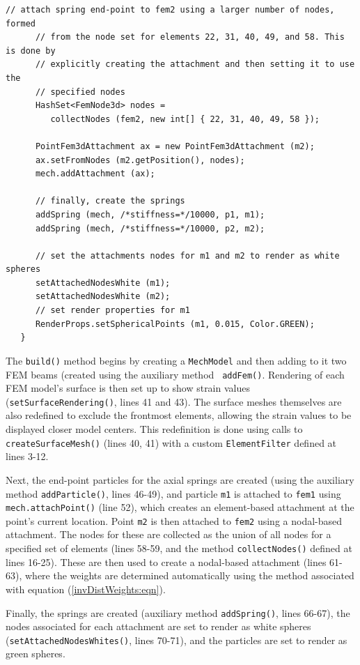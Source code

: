 \begin{lstlisting}[]
      // attach spring end-point to fem2 using a larger number of nodes, formed
      // from the node set for elements 22, 31, 40, 49, and 58. This is done by
      // explicitly creating the attachment and then setting it to use the
      // specified nodes
      HashSet<FemNode3d> nodes =
         collectNodes (fem2, new int[] { 22, 31, 40, 49, 58 });

      PointFem3dAttachment ax = new PointFem3dAttachment (m2);
      ax.setFromNodes (m2.getPosition(), nodes);
      mech.addAttachment (ax);

      // finally, create the springs
      addSpring (mech, /*stiffness=*/10000, p1, m1);
      addSpring (mech, /*stiffness=*/10000, p2, m2);

      // set the attachments nodes for m1 and m2 to render as white spheres
      setAttachedNodesWhite (m1);
      setAttachedNodesWhite (m2);
      // set render properties for m1
      RenderProps.setSphericalPoints (m1, 0.015, Color.GREEN);
   }
\end{lstlisting}
\lstset{numbers=none}
The {\tt build()} method begins by creating a {\tt MechModel} and then
adding to it two FEM beams (created using the auxiliary method {\tt
addFem()}. Rendering of each FEM model's surface is then set up to
show strain values ({\tt setSurfaceRendering()}, lines 41 and 43).
The surface meshes themselves are also redefined to exclude the
frontmost elements, allowing the strain values to be displayed closer
model centers. This redefinition is done using calls to {\tt
createSurfaceMesh()} (lines 40, 41) with a custom {\tt ElementFilter}
defined at lines 3-12.

Next, the end-point particles for the axial springs are created (using
the auxiliary method {\tt addParticle()}, lines
46-49), and particle {\tt m1} is attached to {\tt fem1} using {\tt
mech.attachPoint()} (line 52), which creates an element-based
attachment at the point's current location. Point {\tt m2} is then
attached to {\tt fem2} using a nodal-based attachment.  The nodes for
these are collected as the union of all nodes for a specified set of
elements (lines 58-59, and the method {\tt collectNodes()} defined at
lines 16-25). These are then used to create a nodal-based attachment
(lines 61-63), where the weights are determined automatically using
the method associated with equation (\ref{invDistWeights:eqn}).

Finally, the springs are created (auxiliary method {\tt addSpring()},
lines 66-67), the nodes associated for each attachment are set to
render as white spheres ({\tt setAttachedNodesWhites()}, lines 70-71),
and the particles are set to render as green spheres.

